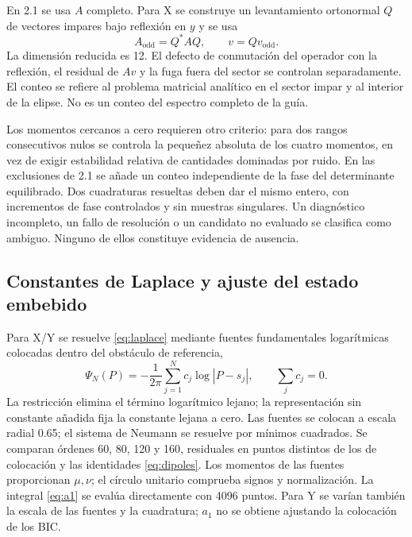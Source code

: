 \documentclass[11pt]{article}
\begin{document}
En 2.1 se usa $A$ completo. Para X se construye un levantamiento ortonormal $Q$ de vectores impares bajo reflexión en $y$ y se usa
\begin{equation}
 A_{\mathrm{odd}}=Q^*AQ,\qquad v=Qv_{\mathrm{odd}}.\label{eq:odd}
\end{equation}
La dimensión reducida es 12. El defecto de conmutación del operador con la reflexión, el residual de $Av$ y la fuga fuera del sector se controlan separadamente. El conteo se refiere al problema matricial analítico en el sector impar y al interior de la elipse. No es un conteo del espectro completo de la guía.

Los momentos cercanos a cero requieren otro criterio: para dos rangos consecutivos nulos se controla la pequeñez absoluta de los cuatro momentos, en vez de exigir estabilidad relativa de cantidades dominadas por ruido. En las exclusiones de 2.1 se añade un conteo independiente de la fase del determinante equilibrado. Dos cuadraturas resueltas deben dar el mismo entero, con incrementos de fase controlados y sin muestras singulares. Un diagnóstico incompleto, un fallo de resolución o un candidato no evaluado se clasifica como ambiguo. Ninguno de ellos constituye evidencia de ausencia.

\subsection{Constantes de Laplace y ajuste del estado embebido}
Para X/Y se resuelve \eqref{eq:laplace} mediante fuentes fundamentales logarítmicas colocadas dentro del obstáculo de referencia,
\begin{equation}
 \Psi_N(P)=-\frac{1}{2\pi}\sum_{j=1}^N c_j\log|P-s_j|,
 \qquad \sum_jc_j=0.\label{eq:mfs}
\end{equation}
La restricción elimina el término logarítmico lejano; la representación sin constante añadida fija la constante lejana a cero. Las fuentes se colocan a escala radial 0.65; el sistema de Neumann se resuelve por mínimos cuadrados. Se comparan órdenes 60, 80, 120 y 160, residuales en puntos distintos de los de colocación y las identidades \eqref{eq:dipoles}. Los momentos de las fuentes proporcionan $\mu,\nu$; el círculo unitario comprueba signos y normalización. La integral \eqref{eq:a1} se evalúa directamente con 4096 puntos. Para Y se varían también la escala de las fuentes y la cuadratura; $a_1$ no se obtiene ajustando la colocación de los BIC.
\end{document}
